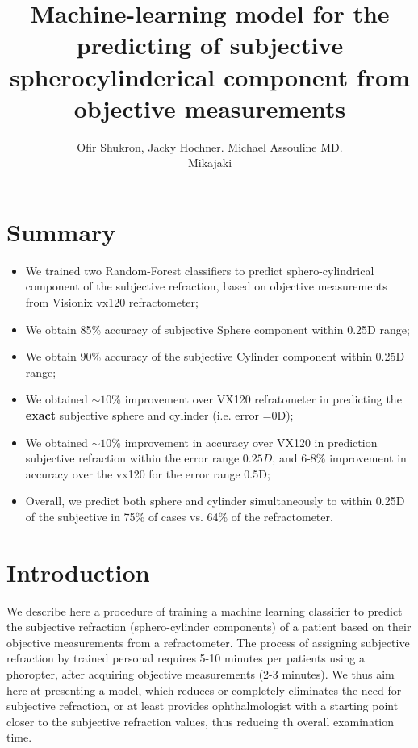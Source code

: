 \documentclass[article,twocolumn,preprint,10pt]{paper}%
\renewcommand{\(}{\left(}
\renewcommand{\)}{\right)}
\renewcommand{\[}{\left[}
\renewcommand{\]}{\right]}
\newcommand{\1}{\mbox{\boldmath$1$}}
\begin{document}
	\title{Machine-learning model for the predicting of subjective spherocylinderical component from objective measurements}
	\author{Ofir Shukron, Jacky Hochner. Michael Assouline MD.\\   Mikajaki}
	
	\maketitle
	\section{Summary}\label{section:Highlights}
	 \begin{itemize}
		\item We trained two Random-Forest classifiers to predict sphero-cylindrical component of the subjective refraction, based on objective measurements from Visionix vx120 refractometer;
		\item We obtain 85\% accuracy of subjective Sphere component within 0.25D range;
		\item We obtain 90\% accuracy of the subjective Cylinder component within 0.25D range;
		\item We obtained $\sim10$\% improvement  over VX120 refratometer in predicting the \textbf{exact} subjective sphere and cylinder (i.e. error =0D);
		\item We obtained $\sim10$\% improvement in accuracy over VX120 in prediction subjective refraction within the error range $0.25D$, and 6-8\% improvement in accuracy over the vx120 for the error range 0.5D;
		\item Overall, we predict both sphere and cylinder simultaneously to within 0.25D of the subjective in 75\% of cases vs. 64\% of the refractometer.
	\end{itemize}
	\section{Introduction}\label{section:Introduction}
	We describe here a procedure of training a machine learning classifier to predict the subjective refraction (sphero-cylinder components) of a patient based on their objective measurements from a refractometer. The process of assigning subjective refraction by trained personal requires 5-10 minutes per patients using a phoropter, after acquiring objective measurements (2-3 minutes). We thus aim here at presenting a model, which reduces or completely eliminates the need for subjective refraction, or at least provides ophthalmologist with a starting point closer to the subjective refraction values, thus reducing th overall examination time.
	
\end{document}

